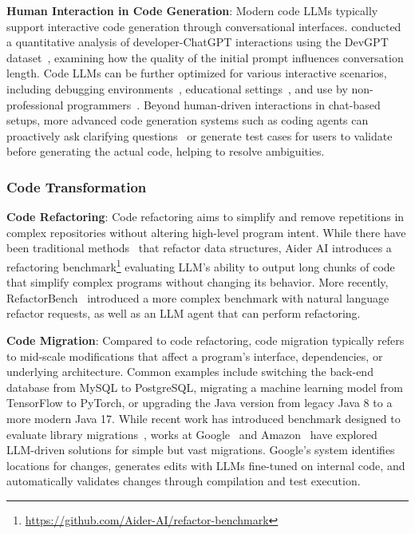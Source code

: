 \textbf{Human Interaction in Code Generation}: 
Modern code LLMs typically support interactive code generation through conversational interfaces. 
\citet{10555598} conducted a quantitative analysis of developer-ChatGPT interactions using the DevGPT dataset~\citep{xiao2024devgpt}, examining how the quality of the initial prompt influences conversation length. 
Code LLMs can be further optimized for various interactive scenarios, including debugging environments~\citep{surameery2023use}, educational settings~\citep{kazemitabaar2023studying, kazemitabaar2023novices, prather2023s, sheese2024patterns}, and use by non-professional programmers~\cite{yan2024intelliexplain}. 
Beyond human-driven interactions in chat-based setups, more advanced code generation systems such as coding agents can proactively ask clarifying questions~\citep{vijayvargiya2025interactiveagentsovercomeambiguity} or generate test cases for users to validate~\citep{lahiri2022interactive, fakhoury2024llm} before generating the actual code, helping to resolve ambiguities.



\subsubsection{Code Transformation}

\textbf{Code Refactoring}:
Code refactoring aims to simplify and remove repetitions in complex repositories without altering high-level program intent.
While there have been traditional methods~\citep{pailoor2024refactoring} that refactor data structures, Aider AI introduces a refactoring benchmark\footnote{\url{https://github.com/Aider-AI/refactor-benchmark}} evaluating LLM's ability to output long chunks of code that simplify complex programs without changing its behavior.
More recently, RefactorBench~\citep{gautam2024refactorbench} introduced a more complex benchmark with natural language refactor requests, as well as an LLM agent that can perform refactoring.

\textbf{Code Migration}:
Compared to code refactoring, code migration typically refers to mid-scale modifications that affect a program’s interface, dependencies, or underlying architecture. 
Common examples include switching the back-end database from MySQL to PostgreSQL, migrating a machine learning model from TensorFlow to PyTorch, or upgrading the Java version from legacy Java 8 to a more modern Java 17. 
While recent work has introduced benchmark designed to evaluate library migrations~\citep{islam2023pymigbench}, works at Google~\citep{nikolov2025google} and Amazon~\citep{omidvar2024evaluating} have explored LLM-driven solutions for simple but vast migrations.
Google's system identifies locations for changes, generates edits with LLMs fine-tuned on internal code, and automatically validates changes through compilation and test execution.

